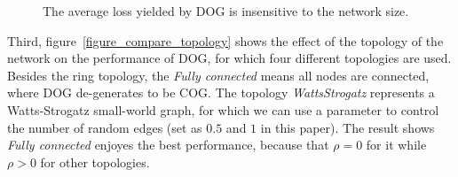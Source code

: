 \documentclass{article}
\begin{document}
\begin{figure}[!h]
\caption{The average loss yielded by DOG is insensitive to the network size.}
\label{figure_compare_network_size}
\end{figure}


Third, figure~\ref{figure_compare_topology} shows the effect of the topology of the network on the performance of DOG, for which four different topologies are used. Besides the ring topology, the \textit{Fully connected} means all nodes are connected, where DOG de-generates to be COG. The topology  \textit{WattsStrogatz} represents a Watts-Strogatz small-world graph, for which we can use a parameter to control the number of random edges (set as $0.5$ and $1$ in this paper). The result shows \textit{Fully connected} enjoyes the best performance, because that $\rho = 0$ for it while $\rho>0$ for other topologies.  
\end{document}
